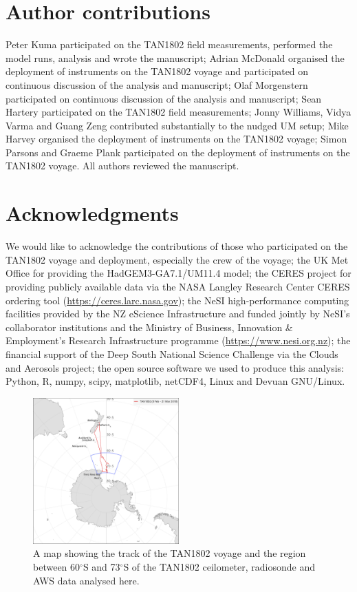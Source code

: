 \section*{Author contributions}

Peter Kuma participated on the TAN1802 field measurements, performed the model runs, analysis and wrote the manuscript;
Adrian McDonald organised the deployment of instruments on the TAN1802 voyage and participated on continuous discussion of the analysis
and manuscript;
Olaf Morgenstern participated on continuous discussion of the analysis and
manuscript;
Sean Hartery participated on the TAN1802 field measurements;
Jonny Williams, Vidya Varma and Guang Zeng contributed substantially to the
nudged UM setup;
Mike Harvey organised the deployment of instruments on the TAN1802 voyage;
Simon Parsons and Graeme Plank participated on the deployment of instruments on the TAN1802
voyage. All authors reviewed the manuscript.

\section*{Acknowledgments}

We would like to acknowledge the contributions of those who participated on
the TAN1802 voyage and deployment, especially the crew of the voyage; the UK Met
Office for providing the HadGEM3-GA7.1/UM11.4 model;
the CERES project for providing publicly available data via the NASA Langley
Research Center CERES ordering tool (\url{https://ceres.larc.nasa.gov});
the
NeSI high-performance computing facilities
provided by the NZ eScience Infrastructure and funded jointly by NeSI's
collaborator institutions and the Ministry of Business, Innovation \&
Employment's Research Infrastructure programme (\url{https://www.nesi.org.nz});
the financial support of the Deep South National Science Challenge via the Clouds and
Aerosols project; the open source software we used to produce this analysis: Python, R,
numpy, scipy, matplotlib,
netCDF4, Linux and Devuan GNU/Linux.

\clearpage

\begin{figure}[t]
\centering
\includegraphics[width=0.5\textwidth]{chapter4/fig/map.pdf}
\caption[A map showing the track of the TAN1802 voyage]{A map showing the track of the TAN1802 voyage and the region
between 60$^\circ$S and 73$^\circ$S of the TAN1802 ceilometer, radiosonde
and AWS data analysed here.
}
\label{fig:map}
\end{figure}

